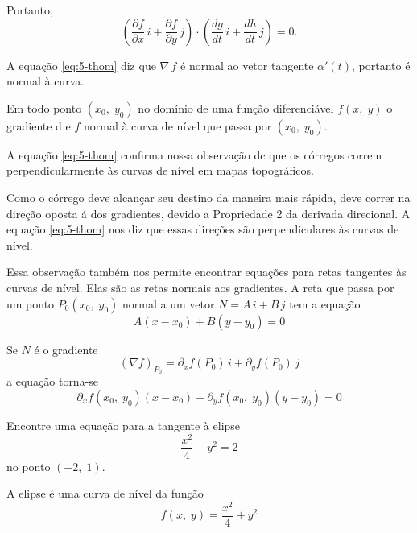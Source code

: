 Portanto,
\begin{equation}\label{eq:5-thom}
	\left(\frac{\partial f}{\partial x}\, i+\frac{\partial f}{\partial y}\, j \right)\cdot \left(\frac{dg}{dt}\, i + \frac{dh}{dt}\, j \right) = 0.
\end{equation}

A equação \eqref{eq:5-thom} diz que \(\nabla\, f\) é normal ao vetor tangente \(\alpha'(t)\), portanto é normal à curva.


Em todo ponto \((x_{0},\; y_{0})\) no domínio de uma função diferenciável \(f(x,\; y)\) o gradiente d e \(f\) normal à curva de nível que passa por \((x_{0},\; y_{0})\).

A equação \eqref{eq:5-thom} confirma nossa observação dc que os córregos correm perpendicularmente às curvas de nível em mapas topográficos.

Como o córrego deve alcançar seu destino da maneira mais rápida, deve correr na direção oposta á dos gradientes, devido a Propriedade 2 da derivada direcional. A equação \eqref{eq:5-thom} nos diz que essas direções são perpendiculares às curvas de nível.

Essa observação também nos permite encontrar equações para retas tangentes às curvas de nível. Elas são as retas normais aos gradientes. A reta que passa por um ponto \(P_{0}(x_{0},\;y_{0})\) normal a um vetor \(N = A\,i +B\,j\) tem a equação
\begin{equation*}
	A(x-x_{0})+B(y-y_{0})=0
\end{equation*}

Se \(N\) é o gradiente
\begin{equation*}
	(\nabla f)_{P_{0}}= \partial_{x}f(P_{0})\, i +\partial_{y}f(P_{0})\, j
\end{equation*}
a equação torna-se
\begin{equation}\label{eq:6-thom}
	\partial_{x}f(x_{0},\; y_{0})(x-x_{0})+\partial_{y}f(x_{0},\; y_{0})(y-y_{0})=0
\end{equation}

\begin{exc}
	Encontre uma equação para a tangente à elipse
	\begin{equation*}
		\frac{x^{2}}{4}+y^{2} =2
	\end{equation*}
	no ponto \((-2, \; 1)\).
\end{exc}

\solo
A elipse é uma curva de nível da função
\begin{equation*}
	f(x,\; y) = \frac{x^{2}}{4}+y^{2}
\end{equation*}

